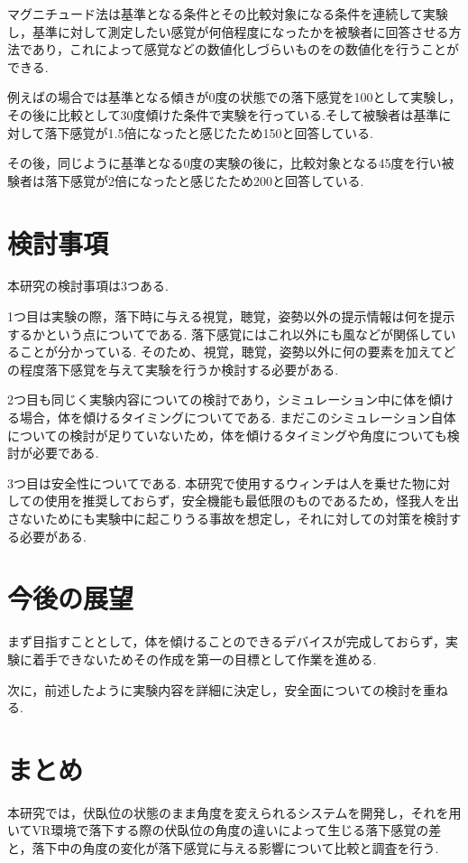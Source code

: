 \documentclass[uplatex]{jsarticle}
\begin{document}
マグニチュード法は基準となる条件とその比較対象になる条件を連続して実験し，基準に対して測定したい感覚が何倍程度になったかを被験者に回答させる方法であり，これによって感覚などの数値化しづらいものをの数値化を行うことができる.

例えばの場合では基準となる傾きが0度の状態での落下感覚を100として実験し，その後に比較として30度傾けた条件で実験を行っている.そして被験者は基準に対して落下感覚が1.5倍になったと感じたため150と回答している.

その後，同じように基準となる0度の実験の後に，比較対象となる45度を行い被験者は落下感覚が2倍になったと感じたため200と回答している.

\section{検討事項}
本研究の検討事項は3つある.

1つ目は実験の際，落下時に与える視覚，聴覚，姿勢以外の提示情報は何を提示するかという点についてである.
落下感覚にはこれ以外にも風などが関係していることが分かっている\cite{青木誠也2018音と風によって浮遊感を感じさせる装置の制作}.
そのため、視覚，聴覚，姿勢以外に何の要素を加えてどの程度落下感覚を与えて実験を行うか検討する必要がある.

2つ目も同じく実験内容についての検討であり，シミュレーション中に体を傾ける場合，体を傾けるタイミングについてである.
まだこのシミュレーション自体についての検討が足りていないため，体を傾けるタイミングや角度についても検討が必要である.

3つ目は安全性についてである.
本研究で使用するウィンチは人を乗せた物に対しての使用を推奨しておらず，安全機能も最低限のものであるため，怪我人を出さないためにも実験中に起こりうる事故を想定し，それに対しての対策を検討する必要がある.

\section{今後の展望}
まず目指すこととして，体を傾けることのできるデバイスが完成しておらず，実験に着手できないためその作成を第一の目標として作業を進める.

次に，前述したように実験内容を詳細に決定し，安全面についての検討を重ねる.

\section{まとめ}
本研究では，伏臥位の状態のまま角度を変えられるシステムを開発し，それを用いてVR環境で落下する際の伏臥位の角度の違いによって生じる落下感覚の差と，落下中の角度の変化が落下感覚に与える影響について比較と調査を行う.


 
\end{document}
